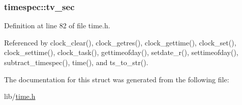 \subsubsection[{\texorpdfstring{tv\+\_\+sec}{tv_sec}}]{ timespec\+::tv\+\_\+sec}\hypertarget{structtimespec_afc3302668d7cb5952f590da69fdd4955}{}\label{structtimespec_afc3302668d7cb5952f590da69fdd4955}


Definition at line 82 of file time.\+h.



Referenced by clock\+\_\+clear(), clock\+\_\+getres(), clock\+\_\+gettime(), clock\+\_\+set(), clock\+\_\+settime(), clock\+\_\+task(), gettimeofday(), setdate\+\_\+r(), settimeofday(), subtract\+\_\+timespec(), time(), and ts\+\_\+to\+\_\+str().



The documentation for this struct was generated from the following file\+:\begin{DoxyCompactItemize}
\item 
lib/\hyperlink{time_8h}{time.\+h}\end{DoxyCompactItemize}
